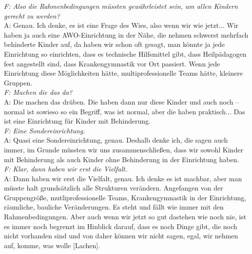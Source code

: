 \begin{linenumbers*}
\emph{F: Also die Rahmenbedingungen müssten gewährleistet sein, um allen Kindern gerecht zu werden?}\\
A: Genau. Ich denke, es ist eine Frage des Wies, also wenn wir wie jetzt... Wir haben ja auch eine AWO-Einrichtung in der Nähe, die nehmen schwerst mehrfach behinderte Kinder auf, da haben wir schon oft gesagt, man könnte ja jede Einrichtung so einrichten, dass es technische Hilfsmittel gibt, dass Heilpädagogen fest angestellt sind, dass Krankengymnastik vor Ort passiert. Wenn jede Einrichtung diese Möglichkeiten hätte, multiprofessionelle Teams hätte, kleinere Gruppen.\\\emph{F: Machen die das da?}\\
A: Die machen das drüben. Die haben dann nur diese Kinder und auch noch -- normal ist sowieso so ein Begriff, was ist normal, aber die haben praktisch... Das ist eine Einrichtung für Kinder mit Behinderung.\\
\emph{F: Eine Sondereinrichtung.}\\
A: Quasi eine Sondereinrichtung, genau.
Deshalb denke ich, die sagen auch immer, im Grunde müssten wir uns zusammenschließen, dass wir sowohl Kinder mit Behinderung als auch Kinder ohne Behinderung in der Einrichtung haben.\\
\emph{F: Klar, dann haben wir erst die Vielfalt.}\\
A: Dann haben wir erst die Vielfalt, genau. Ich denke es ist machbar, aber man müsste halt grundsätzlich alle Strukturen verändern. Angefangen von der Gruppengröße, mutliprofessionelle Teams, Krankengymnastik in der Einrichtung, räumliche, bauliche Veränderungen. Es steht und fällt wie immer mit den Rahmenbedingungen. 
Aber auch wenn wir jetzt so gut dastehen wie noch nie, ist es immer noch begrenzt im Hinblick darauf, dass es noch Dinge gibt, die noch nicht vorhanden sind und von daher können wir nicht sagen, egal, wir nehmen auf, komme, was wolle {[Lachen]}. 


\end{linenumbers*}
